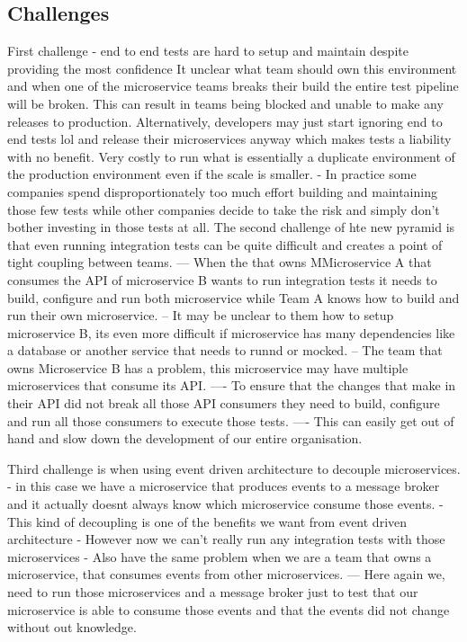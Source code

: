 \documentclass[a4paper, 11pt]{book}
\begin{document}
    \subsection{Challenges}
    First challenge - end to end tests are hard to setup and maintain despite providing the most confidence
    It unclear what team should own this environment and when one of the microservice teams breaks their build the entire test pipeline will be broken.
    This can result in teams being blocked and unable to make any releases to production.
    Alternatively, developers may just start ignoring end to end tests lol and release their microservices anyway which makes tests a liability with no benefit.
    Very costly to run what is essentially a duplicate environment of the production environment even if the scale is smaller.
    - In practice some companies spend disproportionately too much effort building and maintaining those few tests while other companies decide to take the risk and simply don't bother investing in those tests at all.
    The second challenge of hte new pyramid is that even running integration tests can be quite difficult and creates a point of tight coupling between teams.
    --- When the that owns MMicroservice A that consumes the API of microservice B wants to run integration tests it needs to build, configure and run both microservice while Team A knows how to build and run their own microservice.
    -- It may be unclear to them how to setup microservice B, its even more difficult if microservice has many dependencies like a database or another service that needs to runnd or mocked.
    -- The team that owns Microservice B has a problem, this microservice may have multiple microservices that consume its API.
    ---- To ensure that the changes that make in their API did not break all those API consumers they need to build, configure and run all those consumers to execute those tests.
    ---- This can easily get out of hand and slow down the development of our entire organisation.

    Third challenge is when using event driven architecture to decouple microservices.
    - in this case we have a microservice that produces events to a message broker and it actually doesnt always know which microservice consume those events.
    - This kind of decoupling is one of the benefits we want from event driven architecture
    - However now we can't really run any integration tests with those microservices
    - Also have the same problem when we are a team that owns a microservice, that consumes events from other microservices.
    --- Here again we, need to run those microservices and a message broker just to test that our microservice is able to consume those events and that the events did not change without out knowledge.
\end{document}
